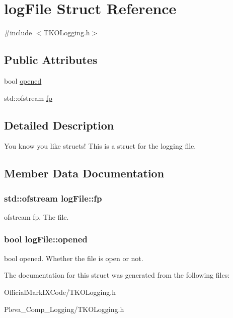 \hypertarget{structlog_file}{\section{log\-File Struct Reference}
\label{structlog_file}
}


{\ttfamily \#include $<$T\-K\-O\-Logging.\-h$>$}

\subsection*{Public Attributes}
\begin{DoxyCompactItemize}
\item 
bool \hyperlink{structlog_file_a4a069d00b4f684751ecba0c9625eeae6}{opened}
\item 
std\-::ofstream \hyperlink{structlog_file_a78d1ffa2264f3fcb04177e06803a9426}{fp}
\end{DoxyCompactItemize}


\subsection{Detailed Description}
You know you like structs! This is a struct for the logging file. 

\subsection{Member Data Documentation}
\hypertarget{structlog_file_a78d1ffa2264f3fcb04177e06803a9426}{
\subsubsection[{fp}]{\setlength{\rightskip}{0pt plus 5cm}std\-::ofstream log\-File\-::fp}}\label{structlog_file_a78d1ffa2264f3fcb04177e06803a9426}
ofstream fp. The file. \hypertarget{structlog_file_a4a069d00b4f684751ecba0c9625eeae6}{
\subsubsection[{opened}]{\setlength{\rightskip}{0pt plus 5cm}bool log\-File\-::opened}}\label{structlog_file_a4a069d00b4f684751ecba0c9625eeae6}
bool opened. Whether the file is open or not. 

The documentation for this struct was generated from the following files\-:\begin{DoxyCompactItemize}
\item 
Official\-Mark\-I\-X\-Code/T\-K\-O\-Logging.\-h\item 
Pleva\-\_\-\-Comp\-\_\-\-Logging/T\-K\-O\-Logging.\-h\end{DoxyCompactItemize}
